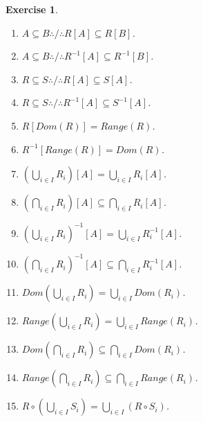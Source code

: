 \documentclass[10pt,a4paper]{book}
\newtheorem{exercise}{Exercise}[section]
\begin{document}
\begin{exercise}
\begin{enumerate}
        \item $A\subseteq B \therefore / \therefore
                  R[A]\subseteq R[B]$.

        \item $A\subseteq B \therefore / \therefore
                  R^{-1}[A]\subseteq R^{-1}[B]$.

        \item $R\subseteq S \therefore / \therefore
                  R[A]\subseteq S[A]$.

        \item $R\subseteq S \therefore / \therefore
                  R^{-1}[A]\subseteq S^{-1}[A]$.

        \item $R[Dom(R)]=Range(R)$.

        \item $R^{-1}[Range(R)]=Dom(R)$.

        \item $\left(\bigcup_{i\in I}R_i\right)[A]
                  =\bigcup_{i\in I}R_i[A]$.

        \item $\left(\bigcap_{i\in I}R_i\right)[A]
                  \subseteq\bigcap_{i\in I}R_i[A]$.

        \item $\left(\bigcup_{i\in I}R_i\right)^{-1}[A]
                  =\bigcup_{i\in I}R_i^{-1}[A]$.

        \item $\left(\bigcap_{i\in I}R_i\right)^{-1}[A]
                  \subseteq\bigcap_{i\in I}R_i^{-1}[A]$.

        \item $Dom\left(\bigcup_{i\in I}R_i\right)
                  =\bigcup_{i\in I}Dom(R_i)$.

        \item $Range\left(\bigcup_{i\in I}R_i\right)
                  =\bigcup_{i\in I}Range(R_i)$.

        \item $Dom\left(\bigcap_{i\in I}R_i\right)
                  \subseteq\bigcap_{i\in I}Dom(R_i)$.

        \item $Range\left(\bigcap_{i\in I}R_i\right)
                  \subseteq\bigcap_{i\in I}Range(R_i)$.

        \item $R\circ\left(\bigcup_{i\in I}S_i\right)
                  =\bigcup_{i\in I}(R\circ S_i)$.


\end{enumerate}
\end{exercise}
\end{document}
